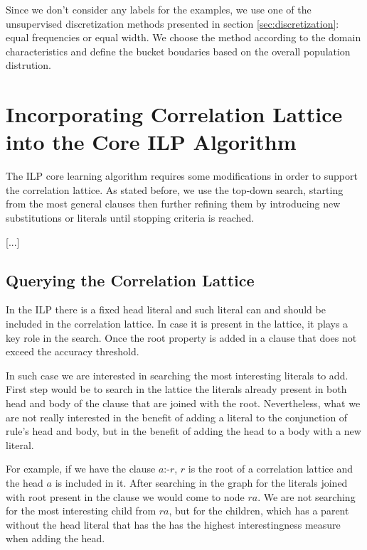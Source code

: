 Since we don't consider any labels for the examples, we use one of the unsupervised discretization methods presented in
section \ref{sec:discretization}: equal frequencies or equal width. We choose the method according to the domain
characteristics and define the bucket boudaries based on the overall population distrution.

\section{Incorporating Correlation Lattice into the Core ILP Algorithm}

The ILP core learning algorithm requires some modifications in order to support the correlation lattice. As stated
before, we use the top-down search, starting from the most general clauses then further refining them by introducing new
substitutions or literals until stopping criteria is reached.

[...]

\subsection{Querying the Correlation Lattice}

In the ILP there is a fixed head literal and such literal can and should be included in the correlation lattice. In case
it is present in the lattice, it plays a key role in the search. Once the root property is added in a clause that does
not exceed the accuracy threshold.

In such case we are interested in searching the most interesting literals to add. First step would be to search in the
lattice the literals already present in both head and body of the clause that are joined with the root. Nevertheless,
what we are not really interested in the benefit of adding a literal to the conjunction of rule's head and body, but in
the benefit of adding the head to a body with a new literal.

For example, if we have the clause $a$:-$r$, $r$ is the root of a correlation lattice and the head $a$ is included in
it. After searching in the graph for the literals joined with root present in the clause we would come to node
$ra$. We are not searching for the most interesting child from $ra$, but for the children, which has a parent without
the head literal that has the has the highest interestingness measure when adding the head.

